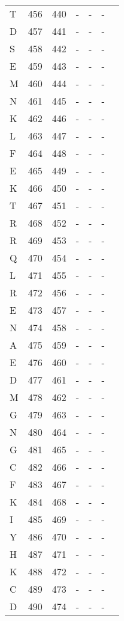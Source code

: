 \documentclass[10pt]{article}
\begin{document}
\begin{longtable}{lllllll}
  T & 456 & 440 & - & - & - &  \\ 
  D & 457 & 441 & - & - & - &  \\ 
  S & 458 & 442 & - & - & - &  \\ 
  E & 459 & 443 & - & - & - &  \\ 
  M & 460 & 444 & - & - & - &  \\ 
  N & 461 & 445 & - & - & - &  \\ 
  K & 462 & 446 & - & - & - &  \\ 
  L & 463 & 447 & - & - & - &  \\ 
  F & 464 & 448 & - & - & - &  \\ 
  E & 465 & 449 & - & - & - &  \\ 
  K & 466 & 450 & - & - & - &  \\ 
  T & 467 & 451 & - & - & - &  \\ 
  R & 468 & 452 & - & - & - &  \\ 
  R & 469 & 453 & - & - & - &  \\ 
  Q & 470 & 454 & - & - & - &  \\ 
  L & 471 & 455 & - & - & - &  \\ 
  R & 472 & 456 & - & - & - &  \\ 
  E & 473 & 457 & - & - & - &  \\ 
  N & 474 & 458 & - & - & - &  \\ 
  A & 475 & 459 & - & - & - &  \\ 
  E & 476 & 460 & - & - & - &  \\ 
  D & 477 & 461 & - & - & - &  \\ 
  M & 478 & 462 & - & - & - &  \\ 
  G & 479 & 463 & - & - & - &  \\ 
  N & 480 & 464 & - & - & - &  \\ 
  G & 481 & 465 & - & - & - &  \\ 
  C & 482 & 466 & - & - & - &  \\ 
  F & 483 & 467 & - & - & - &  \\ 
  K & 484 & 468 & - & - & - &  \\ 
  I & 485 & 469 & - & - & - &  \\ 
  Y & 486 & 470 & - & - & - &  \\ 
  H & 487 & 471 & - & - & - &  \\ 
  K & 488 & 472 & - & - & - &  \\ 
  C & 489 & 473 & - & - & - &  \\ 
  D & 490 & 474 & - & - & - &  \\ 

\end{longtable}
\end{document}
